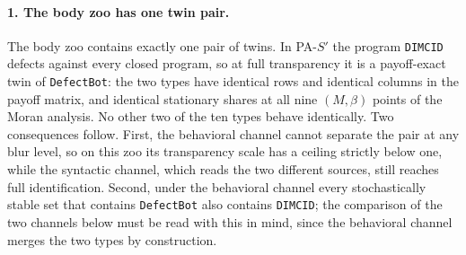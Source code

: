 %
\paragraph{1. The body zoo has one twin pair.}
The body zoo contains exactly one pair of twins. In PA-$S'$ the program \texttt{DIMCID} defects against every closed program, so at full transparency it is a payoff-exact twin of \texttt{DefectBot}: the two types have identical rows and identical columns in the payoff matrix, and identical stationary shares at all nine $(M,\beta)$ points of the Moran analysis. No other two of the ten types behave identically.
Two consequences follow. First, the behavioral channel cannot separate the pair at any blur level, so on this zoo its transparency scale has a ceiling strictly below one, while the syntactic channel, which reads the two different sources, still reaches full identification. Second, under the behavioral channel every stochastically stable set that contains \texttt{DefectBot} also contains \texttt{DIMCID}; the comparison of the two channels below must be read with this in mind, since the behavioral channel merges the two types by construction.
%
